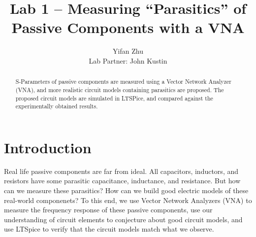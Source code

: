 \documentclass{article}
\begin{document}
\title{Lab 1 -- Measuring ``Parasitics'' of Passive Components with a VNA}
\author{
    Yifan Zhu\\
    Lab Partner: John Kustin
}
\maketitle

\begin{abstract}
    S-Parameters of passive components are measured using a Vector Network Analyzer (VNA), and more realistic circuit models containing parasitics are proposed.
    The proposed circuit models are simulated in LTSPice, and compared against the experimentally obtained results.
\end{abstract}

\section{Introduction}
Real life passive components are far from ideal.
All capacitors, inductors, and resistors have some parasitic capacitance, inductance, and resistance.
But how can we measure these parasitics?
How can we build good electric models of these real-world componenets?
To this end, we use Vector Network Analyzers (VNA) to measure the frequency response of these passive components, use our understanding of circuit elements to conjecture about good circuit models, and use LTSpice to verify that the circuit models match what we observe.
\end{document}
